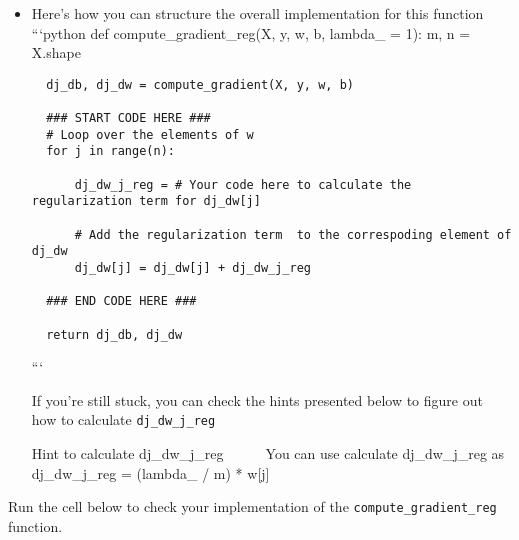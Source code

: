 \documentclass[11pt]{article}
\begin{document}
\begin{itemize}
\item
  Here's how you can structure the overall implementation for this
  function ```python def compute\_gradient\_reg(X, y, w, b, lambda\_ =
  1): m, n = X.shape

\begin{verbatim}
  dj_db, dj_dw = compute_gradient(X, y, w, b)

  ### START CODE HERE ###     
  # Loop over the elements of w
  for j in range(n): 

      dj_dw_j_reg = # Your code here to calculate the regularization term for dj_dw[j]

      # Add the regularization term  to the correspoding element of dj_dw
      dj_dw[j] = dj_dw[j] + dj_dw_j_reg

  ### END CODE HERE ###         

  return dj_db, dj_dw
\end{verbatim}

  ```

  If you're still stuck, you can check the hints presented below to
  figure out how to calculate \texttt{dj\_dw\_j\_reg}

  Hint to calculate dj\_dw\_j\_reg     You can use calculate
  dj\_dw\_j\_reg as dj\_dw\_j\_reg = (lambda\_ / m) * w{[}j{]}
\end{itemize}

    Run the cell below to check your implementation of the
\texttt{compute\_gradient\_reg} function.
\end{document}
